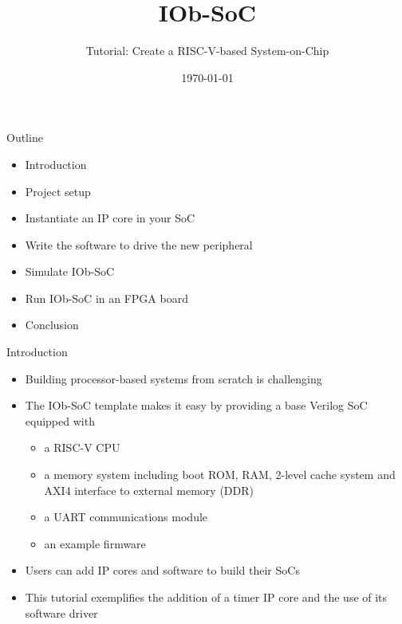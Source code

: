 \documentclass [xcolor=svgnames, t] {beamer}
\title[IOb-SoC Presentation]{IOb-SoC}
\subtitle{Tutorial: Create a RISC-V-based System-on-Chip}
\institute[IObundle Lda.]{IObundle Lda.}
\date{\today}
\begin{document}
\begin{frame}
 \titlepage   
\end{frame}


\begin{frame}{Outline}
\begin{center}
   \begin{itemize}
     \item Introduction
     \item Project setup
     \item Instantiate an IP core in your SoC
     \item Write the software to drive the new peripheral
     \item Simulate IOb-SoC
     \item Run IOb-SoC in an FPGA board
     \item Conclusion
 \end{itemize}
\end{center}
\end{frame}


\begin{frame}{Introduction}
\begin{center}
    \begin{itemize}
      \item Building processor-based systems from scratch is challenging
      \item The IOb-SoC template makes it easy by providing a base Verilog SoC equipped with
        \begin{itemize}
        \item a RISC-V CPU
        \item a memory system including boot ROM, RAM, 2-level cache system and AXI4 interface to external memory (DDR)
        \item a UART communications module
        \item an example firmware
        \end{itemize}
      \item Users can add IP cores and software to build their SoCs
      \item This tutorial exemplifies the addition of a timer IP core and the use of its software driver
    \end{itemize}
\end{center}
\end{frame}
\end{document}
